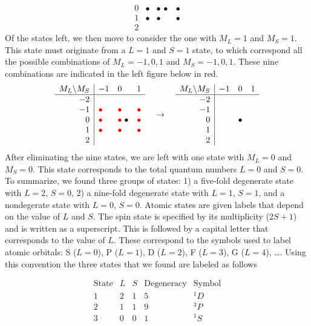 \documentclass[../Main/chem532-notes.tex]{subfiles}
\begin{document}
\begin{example}
\begin{equation*}
\begin{array}{r|lll}
0 & \bullet &\bullet \, \bullet& \bullet\\
1 & \bullet & \bullet& \bullet\\
2 & &&
\end{array}
\end{equation*}
Of the states left, we then move to consider the one with $M_L = 1$ and $M_S = 1$.
This state must originate from a $L=1$ and $S=1$ state, to which correspond all the possible combinations of $M_L = -1,0,1$ and $M_S = -1,0,1$. These nine combinations are indicated in the left figure below in red.
\begin{equation*}
   \begin{array}{r|lll}
    M_L \backslash M_S & -1 & 0 & 1 \\
    \hline
-2 & & &  \\
-1 & {\color{red}\bullet}  &{\color{red}\bullet} & {\color{red}\bullet} \\
0 & {\color{red}\bullet} &{\color{red}\bullet} \; \bullet & {\color{red}\bullet}\\
1 & {\color{red}\bullet} &{\color{red}\bullet} & {\color{red}\bullet}\\
2 & &&
\end{array}
\quad \rightarrow \quad 
   \begin{array}{r|lll}
    M_L \backslash M_S & -1 & 0 & 1 \\
    \hline
-2 & &  &  \\
-1 & &  &  \\
0 &  &\bullet & \\
1 & &  &  \\
2 & &&
\end{array}
\end{equation*}
After eliminating the nine states, we are left with one state with $M_L = 0$ and $M_S = 0$. This state corresponds to the total quantum numbers $L = 0$ and $S = 0$.
To summarize, we found three groups of states: 1) a five-fold degenerate state with $L=2$, $S=0$, 2) a nine-fold degenerate state with $L=1$, $S=1$, and a nondegerate state with $L=0$, $S=0$.
Atomic states are given labels that depend on the value of $L$ and $S$.
The spin state is specified by its multiplicity ($2S + 1$) and is written as a superscript.
This is followed by a capital letter that corresponds to the value of $L$. 
These correspond to the symbols used to label atomic orbitals: S ($L = 0$), P ($L = 1$), D ($L = 2$), F ($L = 3$), G ($L = 4$), \ldots.
Using this convention the three states that we found are labeled as follows

\begin{equation*}
\begin{array}{r|llcc}
    \text{State} & L & S & \text{Degeneracy} &  \text{Symbol} \\
    \hline
1 & 2 & 1 & 5 & {^1}D \\
2 & 1 & 1 & 9 & {^3}P \\
3 & 0 & 0 & 1 & {^1}S \\
\end{array}
\end{equation*}
\end{example}
\end{document}
